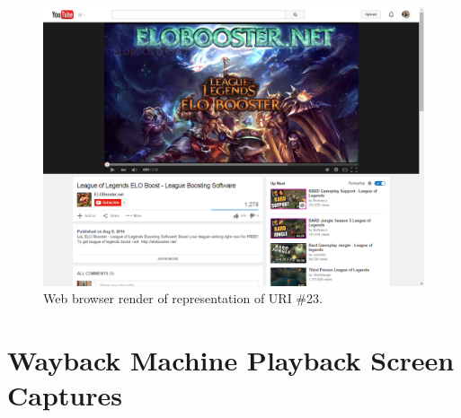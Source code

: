 \documentclass[a4paper,12pt]{article}
\begin{document}
\begin{appendices}
\begin{figure}[H]
    \includegraphics[scale=0.5]{images/23_original.png}
    \caption{Web browser render of representation of URI \#23.}
\end{figure}


\section{Wayback Machine Playback Screen Captures}


\end{appendices}
\end{document}
